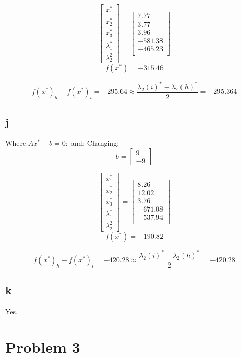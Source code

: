 \documentclass[10pt]{article}
\begin{document}
\[
\begin{bmatrix}
x_1^* \\
x_2^*\\
x_3^* \\
\lambda_1^* \\
\lambda_2^2
\end{bmatrix} =
\begin{bmatrix}
  7.77 \\
  3.77 \\
  3.96 \\
  -581.38 \\
  -465.23 \\
\end{bmatrix}
\]
\[
f(x^*) = -315.46
\] 

\[
f(x^*)_h - f(x^*)_i = -295.64 \approx \frac{\lambda_2(i)^* - \lambda_2(h)^*}{2} = -295.364
\] 



\subsection{j}
Where $Ax^*-b = 0:$ and:
Changing:
\[
b = 
\begin{bmatrix}
  9 \\
  -9
\end{bmatrix}
\]

\[
\begin{bmatrix}
x_1^* \\
x_2^*\\
x_3^* \\
\lambda_1^* \\
\lambda_2^2
\end{bmatrix} =
\begin{bmatrix}
  8.26 \\
  12.02 \\
  3.76 \\
  -671.08 \\
  -537.94 \\
\end{bmatrix}
\]
\[
f(x^*) = -190.82
\] 

\[
f(x^*)_h - f(x^*)_i = -420.28 \approx \frac{\lambda_2(i)^* - \lambda_2(h)^*}{2} = -420.28
\] 


\subsection{k}
Yes.

\newpage
\section{Problem 3}
\end{document}
